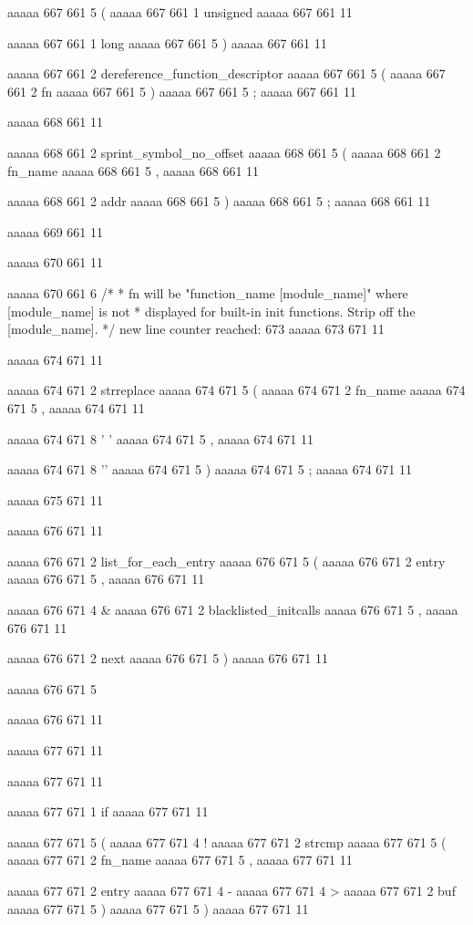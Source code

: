 {aaaaa 667 661
5
(
aaaaa 667 661
1
unsigned
aaaaa 667 661
11
 
aaaaa 667 661
1
long
aaaaa 667 661
5
)
aaaaa 667 661
11
 
aaaaa 667 661
2
dereference_function_descriptor
aaaaa 667 661
5
(
aaaaa 667 661
2
fn
aaaaa 667 661
5
)
aaaaa 667 661
5
;
aaaaa 667 661
11


aaaaa 668 661
11
	
aaaaa 668 661
2
sprint_symbol_no_offset
aaaaa 668 661
5
(
aaaaa 668 661
2
fn_name
aaaaa 668 661
5
,
aaaaa 668 661
11
 
aaaaa 668 661
2
addr
aaaaa 668 661
5
)
aaaaa 668 661
5
;
aaaaa 668 661
11


aaaaa 669 661
11


aaaaa 670 661
11
	
aaaaa 670 661
6
/*
	 * fn will be "function_name [module_name]" where [module_name] is not
	 * displayed for built-in init functions.  Strip off the [module_name].
	 */
new line counter reached: 673
aaaaa 673 671
11


aaaaa 674 671
11
	
aaaaa 674 671
2
strreplace
aaaaa 674 671
5
(
aaaaa 674 671
2
fn_name
aaaaa 674 671
5
,
aaaaa 674 671
11
 
aaaaa 674 671
8
' '
aaaaa 674 671
5
,
aaaaa 674 671
11
 
aaaaa 674 671
8
'\0'
aaaaa 674 671
5
)
aaaaa 674 671
5
;
aaaaa 674 671
11


aaaaa 675 671
11


aaaaa 676 671
11
	
aaaaa 676 671
2
list_for_each_entry
aaaaa 676 671
5
(
aaaaa 676 671
2
entry
aaaaa 676 671
5
,
aaaaa 676 671
11
 
aaaaa 676 671
4
&
aaaaa 676 671
2
blacklisted_initcalls
aaaaa 676 671
5
,
aaaaa 676 671
11
 
aaaaa 676 671
2
next
aaaaa 676 671
5
)
aaaaa 676 671
11
 
aaaaa 676 671
5
{
aaaaa 676 671
11


aaaaa 677 671
11
	
aaaaa 677 671
11
	
aaaaa 677 671
1
if
aaaaa 677 671
11
 
aaaaa 677 671
5
(
aaaaa 677 671
4
!
aaaaa 677 671
2
strcmp
aaaaa 677 671
5
(
aaaaa 677 671
2
fn_name
aaaaa 677 671
5
,
aaaaa 677 671
11
 
aaaaa 677 671
2
entry
aaaaa 677 671
4
-
aaaaa 677 671
4
>
aaaaa 677 671
2
buf
aaaaa 677 671
5
)
aaaaa 677 671
5
)
aaaaa 677 671
11
 
}}
